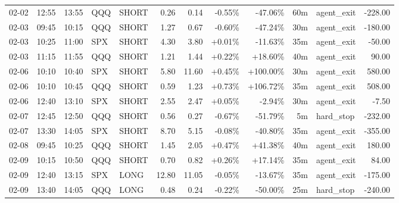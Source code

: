 \documentclass[11pt,a4paper,twoside]{article}
\begin{document}
\begin{center}
\begin{longtable}{>{\color{txtmain}}l l l l l r r r r r >{\color{txtmain}}l r}
02-02 & 12:55 & 13:55 & QQQ & SHORT & 0.26 & 0.14 & \textcolor{lossred}{-0.55\%} & \textcolor{lossred}{-47.06\%} & 60m & agent\_exit & \textcolor{lossred}{-228.00} \\
02-03 & 09:45 & 10:15 & QQQ & SHORT & 1.27 & 0.67 & \textcolor{lossred}{-0.60\%} & \textcolor{lossred}{-47.24\%} & 30m & agent\_exit & \textcolor{lossred}{-180.00} \\
02-03 & 10:25 & 11:00 & SPX & SHORT & 4.30 & 3.80 & \textcolor{wingreen}{+0.01\%} & \textcolor{lossred}{-11.63\%} & 35m & agent\_exit & \textcolor{lossred}{-50.00} \\
02-03 & 11:15 & 11:55 & QQQ & SHORT & 1.21 & 1.44 & \textcolor{wingreen}{+0.22\%} & \textcolor{wingreen}{+18.60\%} & 40m & agent\_exit & \textcolor{wingreen}{90.00} \\
02-06 & 10:10 & 10:40 & SPX & SHORT & 5.80 & 11.60 & \textcolor{wingreen}{+0.45\%} & \textcolor{wingreen}{+100.00\%} & 30m & agent\_exit & \textcolor{wingreen}{580.00} \\
02-06 & 10:10 & 10:45 & QQQ & SHORT & 0.59 & 1.23 & \textcolor{wingreen}{+0.73\%} & \textcolor{wingreen}{+106.72\%} & 35m & agent\_exit & \textcolor{wingreen}{508.00} \\
02-06 & 12:40 & 13:10 & SPX & SHORT & 2.55 & 2.47 & \textcolor{wingreen}{+0.05\%} & \textcolor{lossred}{-2.94\%} & 30m & agent\_exit & \textcolor{lossred}{-7.50} \\
02-07 & 12:45 & 12:50 & QQQ & SHORT & 0.56 & 0.27 & \textcolor{lossred}{-0.67\%} & \textcolor{lossred}{-51.79\%} & 5m & hard\_stop & \textcolor{lossred}{-232.00} \\
02-07 & 13:30 & 14:05 & SPX & SHORT & 8.70 & 5.15 & \textcolor{lossred}{-0.08\%} & \textcolor{lossred}{-40.80\%} & 35m & agent\_exit & \textcolor{lossred}{-355.00} \\
02-08 & 09:45 & 10:25 & QQQ & SHORT & 1.45 & 2.05 & \textcolor{wingreen}{+0.47\%} & \textcolor{wingreen}{+41.38\%} & 40m & agent\_exit & \textcolor{wingreen}{180.00} \\
02-09 & 10:15 & 10:50 & QQQ & SHORT & 0.70 & 0.82 & \textcolor{wingreen}{+0.26\%} & \textcolor{wingreen}{+17.14\%} & 35m & agent\_exit & \textcolor{wingreen}{84.00} \\
02-09 & 12:40 & 13:15 & SPX & LONG & 12.80 & 11.05 & \textcolor{lossred}{-0.05\%} & \textcolor{lossred}{-13.67\%} & 35m & agent\_exit & \textcolor{lossred}{-175.00} \\
02-09 & 13:40 & 14:05 & QQQ & LONG & 0.48 & 0.24 & \textcolor{lossred}{-0.22\%} & \textcolor{lossred}{-50.00\%} & 25m & hard\_stop & \textcolor{lossred}{-240.00} \\

\end{longtable}
\end{center}
\end{document}
